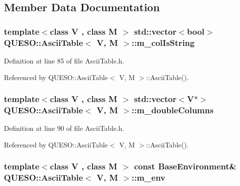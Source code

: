 \subsection{Member Data Documentation}
\hypertarget{class_q_u_e_s_o_1_1_ascii_table_a1c84e461d75e0846c156617f222c2ec3}{
\subsubsection[{m\-\_\-col\-Is\-String}]{\setlength{\rightskip}{0pt plus 5cm}template$<$class V , class M $>$ std\-::vector$<$bool$>$ {\bf Q\-U\-E\-S\-O\-::\-Ascii\-Table}$<$ V, M $>$\-::m\-\_\-col\-Is\-String\hspace{0.3cm}{\ttfamily [private]}}}\label{class_q_u_e_s_o_1_1_ascii_table_a1c84e461d75e0846c156617f222c2ec3}


Definition at line 85 of file Ascii\-Table.\-h.



Referenced by Q\-U\-E\-S\-O\-::\-Ascii\-Table$<$ V, M $>$\-::\-Ascii\-Table().

\hypertarget{class_q_u_e_s_o_1_1_ascii_table_aa25a1d14c88cd5de341c43e052622f51}{
\subsubsection[{m\-\_\-double\-Columns}]{\setlength{\rightskip}{0pt plus 5cm}template$<$class V , class M $>$ std\-::vector$<$V$\ast$$>$ {\bf Q\-U\-E\-S\-O\-::\-Ascii\-Table}$<$ V, M $>$\-::m\-\_\-double\-Columns\hspace{0.3cm}{\ttfamily [private]}}}\label{class_q_u_e_s_o_1_1_ascii_table_aa25a1d14c88cd5de341c43e052622f51}


Definition at line 90 of file Ascii\-Table.\-h.



Referenced by Q\-U\-E\-S\-O\-::\-Ascii\-Table$<$ V, M $>$\-::\-Ascii\-Table().

\hypertarget{class_q_u_e_s_o_1_1_ascii_table_a2ba907db652aa02d53d493980d7a3753}{
\subsubsection[{m\-\_\-env}]{\setlength{\rightskip}{0pt plus 5cm}template$<$class V , class M $>$ const {\bf Base\-Environment}\& {\bf Q\-U\-E\-S\-O\-::\-Ascii\-Table}$<$ V, M $>$\-::m\-\_\-env\hspace{0.3cm}{\ttfamily [private]}}}\label{class_q_u_e_s_o_1_1_ascii_table_a2ba907db652aa02d53d493980d7a3753}


